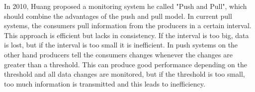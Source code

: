 In 2010, Huang \cite{He_2010} proposed a monitoring system he called "Push and Pull", which should combine the advantages of the push and pull model. In current pull systems, the consumers pull information from the producers in a certain interval. This approach is efficient but lacks in consistency. If the interval is too big, data is lost, but if the interval is too small it is inefficient. In push systems on the other hand producers tell the consumers changes whenever the changes are greater than a threshold. This can produce good performance depending on the threshold and all data changes are monitored, but if the threshold is too small, too much information is transmitted and this leads to inefficiency. 
